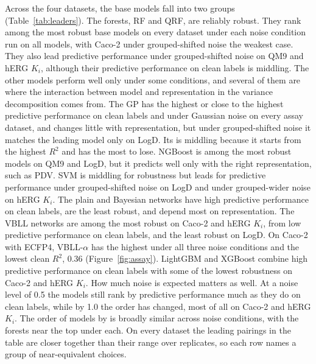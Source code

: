 Across the four datasets, the base models fall into two groups (Table~\ref{tab:leaders}). The forests, RF and QRF, are reliably robust. They rank among the most robust base models on every dataset under each noise condition run on all models, with Caco-2 under grouped-shifted noise the weakest case. They also lead predictive performance under grouped-shifted noise on QM9 and hERG $K_i$, although their predictive performance on clean labels is middling. The other models perform well only under some conditions, and several of them are where the interaction between model and representation in the variance decomposition comes from. The GP has the highest or close to the highest predictive performance on clean labels and under Gaussian noise on every assay dataset, and changes little with representation, but under grouped-shifted noise it matches the leading model only on LogD. Its \aucnorm{} is middling because it starts from the highest $R^2$ and has the most to lose. NGBoost is among the most robust models on QM9 and LogD, but it predicts well only with the right representation, such as PDV. SVM is middling for robustness but leads for predictive performance under grouped-shifted noise on LogD and under grouped-wider noise on hERG $K_i$. The plain and Bayesian networks have high predictive performance on clean labels, are the least robust, and depend most on representation. The VBLL networks are among the most robust on Caco-2 and hERG $K_i$, from low predictive performance on clean labels, and the least robust on LogD. On Caco-2 with ECFP4, VBLL-$\alpha$ has the highest \aucnorm{} under all three noise conditions and the lowest clean $R^2$, 0.36 (Figure~\ref{fig:assay}). LightGBM and XGBoost combine high predictive performance on clean labels with some of the lowest robustness on Caco-2 and hERG $K_i$. How much noise is expected matters as well. At a noise level of 0.5 the models still rank by predictive performance much as they do on clean labels, while by 1.0 the order has changed, most of all on Caco-2 and hERG $K_i$. The order of models by \aucnorm{} is broadly similar across noise conditions, with the forests near the top under each. On every dataset the leading pairings in the table are closer together than their range over replicates, so each row names a group of near-equivalent choices.

